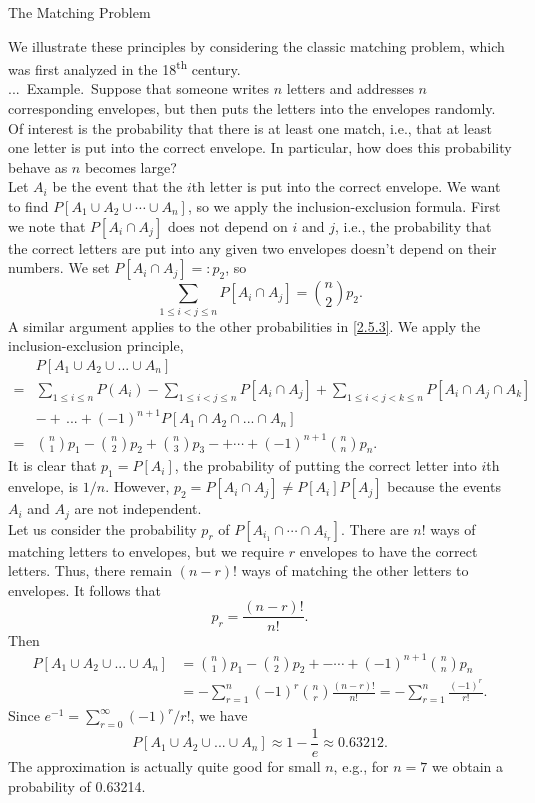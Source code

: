 \documentclass[smaller,hyperref={CJKbookmarks=true}]{beamer}
\newcounter{zhuo}[subsection]
\renewcommand{\thezhuo}{\thesection.\thesubsection.\arabic{zhuo}}
\newenvironment{EXAMPLE}{\stepcounter{zhuo}\alert{\!\thezhuo.~Example.\,}}{}
\begin{document}
\begin{frame}{The Matching Problem}
\begin{spacing}{0.9}
We illustrate these principles by considering the classic matching problem,
which was first analyzed in the 18\textsuperscript{th} century.\\[5pt]
\begin{EXAMPLE}
Suppose that someone writes $n$ letters and addresses $n$
corresponding envelopes, but then puts the letters into the envelopes
randomly. Of interest is the probability that there is at least one match,
i.e., that at least one letter is put into the correct envelope. In particular,
how does this probability behave as $n$ becomes large?\\[5pt]
Let $A_i$ be the event that the $i$th letter is put into the correct envelope. We
want to find $P[A_1\cup A_2\cup\cdots\cup A_n]$, so we apply the inclusion-exclusion formula. First we note that $P[A_i\cap A_j]$ does not depend on $i$ and $j$, i.e., the probability that the correct letters are put into any given two envelopes
doesn't depend on their numbers. We set $P[A_i\cap A_j]=:p_2$, so
\[\sum_{1\leq i<j\leq n}P[A_i\cap A_j]=\binom{n}{2}p_2.\]
A similar argument applies to the other probabilities in \eqref{2.5.3}.
\newpage
We apply the inclusion-exclusion principle,
\begin{align*}
   &P[A_1\cup A_2\cup...\cup A_n]  \\
   =&\sum_{1\leq i\leq n}P(A_i)-\sum_{1\leq i<j\leq n}P[A_i\cap A_j]+\sum_{1\leq i<j<k\leq n}P[A_i\cap A_j\cap A_k]  \\
   &-+\,...+(-1)^{n+1}P[A_1\cap A_2\cap...\cap A_n]  \\
   =&\binom{n}{1}p_1-\binom{n}{2}p_2+\binom{n}{3}p_3
   -+\cdots+(-1)^{n+1}\binom{n}{n}p_n.
\end{align*}
It is clear that $p_1=P[A_i]$, the probability of putting the correct letter into $i$th envelope, is $1/n$. However, $p_2=P[A_i\cap A_j]\neq P[A_i]P[A_j]$ because the events $A_i$ and $A_j$ are not independent.\\[5pt]
Let us consider the probability $p_r$ of $P[A_{i_1}\cap\cdots\cap A_{i_r}]$. There are $n!$ ways of matching letters to envelopes, but we require $r$ envelopes to have the correct letters. Thus, there remain $(n-r)!$ ways of matching the other letters to envelopes.
\newpage
It follows that
\[p_r=\frac{(n-r)!}{n!}.\]
Then
\begin{equation*}
  \begin{split}
     P[A_1\cup A_2\cup...\cup A_n] &=\binom{n}{1}p_1-\binom{n}{2}p_2+-\cdots
     +(-1)^{n+1}\binom{n}{n}p_n \\
       &=-\sum_{r=1}^{n}(-1)^r\binom{n}{r}\frac{(n-r)!}{n!}
       =-\sum_{r=1}^{n}\frac{(-1)^r}{r!}.
  \end{split}
\end{equation*}
Since $e^{-1}=\sum_{r=0}^{\infty}(-1)^r/r!$, we have
\[P[A_1\cup A_2\cup...\cup A_n]\approx
1-\frac{1}{e}\approx0.63212.\]
The approximation is actually quite good for small $n$, e.g., for $n=7$ we obtain a probability of 0.63214.
\end{EXAMPLE}
\end{spacing}
\end{frame}
\end{document}

